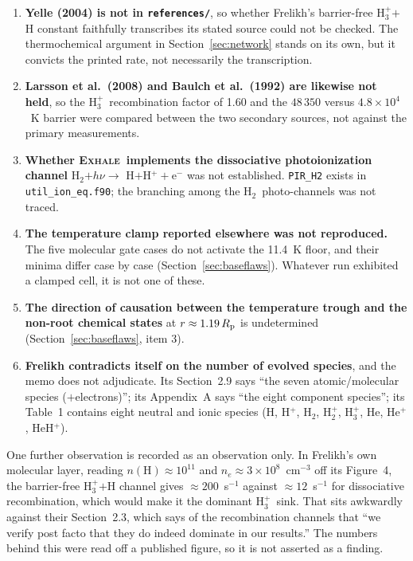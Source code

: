 \documentclass[english,a4paper]{my_memo}
\newcommand{\Rp}{R_{\rm p}}
\newcommand{\EXHALE}{\textsc{Exhale}}
\newcommand{\Hth}{\ensuremath{\mathrm{H}_3^+}}
\newcommand{\Htwo}{\ensuremath{\mathrm{H}_2}}
\begin{document}
\begin{enumerate}[nosep,leftmargin=*]
  \item \textbf{Yelle (2004) is not in \texttt{references/}}, so whether
    Frelikh's barrier-free \Hth$ + $H constant faithfully transcribes its
    stated source could not be checked. The thermochemical argument in
    Section~\ref{sec:network} stands on its own, but it convicts the printed
    rate, not necessarily the transcription.
  \item \textbf{Larsson et al.\ (2008) and Baulch et al.\ (1992) are likewise
    not held}, so the \Hth\ recombination factor of 1.60 and the $48\,350$
    versus $4.8\times10^{4}$~K barrier were compared between the two secondary
    sources, not against the primary measurements.
  \item \textbf{Whether \EXHALE\ implements the dissociative photoionization
    channel} \Htwo$ + h\nu \rightarrow$ H$ + $H$^+ + $e$^-$ was not
    established. \texttt{PIR\_H2} exists in \texttt{util\_ion\_eq.f90}; the
    branching among the \Htwo\ photo-channels was not traced.
  \item \textbf{The temperature clamp reported elsewhere was not reproduced.}
    The five molecular gate cases do not activate the 11.4~K floor, and their
    minima differ case by case (Section~\ref{sec:baseflaws}). Whatever run
    exhibited a clamped cell, it is not one of these.
  \item \textbf{The direction of causation between the temperature trough and
    the non-root chemical states} at $r \approx 1.19\,\Rp$ is undetermined
    (Section~\ref{sec:baseflaws}, item 3).
  \item \textbf{Frelikh contradicts itself on the number of evolved species},
    and the memo does not adjudicate. Its Section~2.9 says ``the seven
    atomic/molecular species ($+$electrons)''; its Appendix~A says ``the eight
    component species''; its Table~1 contains eight neutral and ionic species
    (H, H$^+$, \Htwo, H$_2^+$, \Hth, He, He$^+$, HeH$^+$).
\end{enumerate}

One further observation is recorded as an observation only. In Frelikh's own
molecular layer, reading $n(\mathrm{H}) \approx 10^{11}$ and
$n_e \approx 3\times10^{8}$~cm$^{-3}$ off its Figure~4, the barrier-free
\Hth$ + $H channel gives $\approx200$~s$^{-1}$ against $\approx12$~s$^{-1}$
for dissociative recombination, which would make it the dominant \Hth\ sink.
That sits awkwardly against their Section~2.3, which says of the
recombination channels that ``we verify post facto that they do indeed
dominate in our results.'' The numbers behind this were read off a published
figure, so it is not asserted as a finding.
\end{document}
